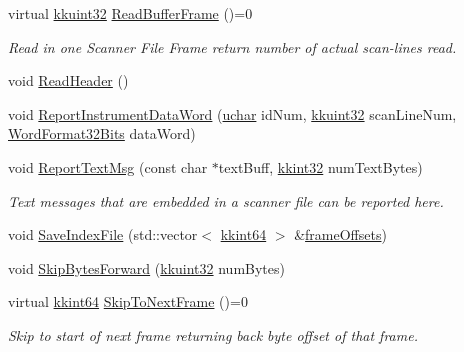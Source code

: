 \begin{DoxyCompactItemize}
\item 
virtual \hyperlink{namespace_k_k_b_af8d832f05c54994a1cce25bd5743e19a}{kkuint32} \hyperlink{class_k_k_l_s_c_1_1_scanner_file_a4131dff88c03ceef3f1dafd95f1447ee}{Read\+Buffer\+Frame} ()=0
\begin{DoxyCompactList}\small\item\em Read in one Scanner File Frame return number of actual scan-\/lines read. \end{DoxyCompactList}\item 
void \hyperlink{class_k_k_l_s_c_1_1_scanner_file_a5995eed90a7c112075e74abc9ddc9cc5}{Read\+Header} ()
\item 
void \hyperlink{class_k_k_l_s_c_1_1_scanner_file_af156749ba59d3e87182ef64a33251f89}{Report\+Instrument\+Data\+Word} (\hyperlink{namespace_k_k_b_ace9969169bf514f9ee6185186949cdf7}{uchar} id\+Num, \hyperlink{namespace_k_k_b_af8d832f05c54994a1cce25bd5743e19a}{kkuint32} scan\+Line\+Num, \hyperlink{union_k_k_b_1_1_word_format32_bits}{Word\+Format32\+Bits} data\+Word)
\item 
void \hyperlink{class_k_k_l_s_c_1_1_scanner_file_a642d150fc6003b4a3e5734c8d7fe38de}{Report\+Text\+Msg} (const char $\ast$text\+Buff, \hyperlink{namespace_k_k_b_a8fa4952cc84fda1de4bec1fbdd8d5b1b}{kkint32} num\+Text\+Bytes)
\begin{DoxyCompactList}\small\item\em Text messages that are embedded in a scanner file can be reported here. \end{DoxyCompactList}\item 
void \hyperlink{class_k_k_l_s_c_1_1_scanner_file_a1201ae6756c4698e0e7705a83ad9651f}{Save\+Index\+File} (std\+::vector$<$ \hyperlink{namespace_k_k_b_aa3486b1c5ea9162b3b020c69f72826eb}{kkint64} $>$ \&\hyperlink{class_k_k_l_s_c_1_1_scanner_file_a61d36c66bb5f16ba82c088cd816b0c68}{frame\+Offsets})
\item 
void \hyperlink{class_k_k_l_s_c_1_1_scanner_file_a1720b94834a2e08d00fd252cd3780b6e}{Skip\+Bytes\+Forward} (\hyperlink{namespace_k_k_b_af8d832f05c54994a1cce25bd5743e19a}{kkuint32} num\+Bytes)
\item 
virtual \hyperlink{namespace_k_k_b_aa3486b1c5ea9162b3b020c69f72826eb}{kkint64} \hyperlink{class_k_k_l_s_c_1_1_scanner_file_a1797e4ba35b312c53da2c453f1303f35}{Skip\+To\+Next\+Frame} ()=0
\begin{DoxyCompactList}\small\item\em Skip to start of next frame returning back byte offset of that frame. \end{DoxyCompactList}\item 

\end{DoxyCompactItemize}
